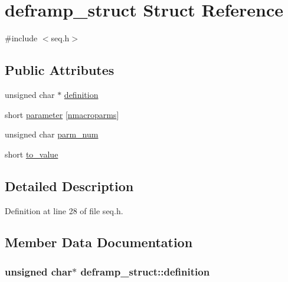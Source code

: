 \hypertarget{structdeframp__struct}{}\section{deframp\+\_\+struct Struct Reference}
\label{structdeframp__struct}


{\ttfamily \#include $<$seq.\+h$>$}

\subsection*{Public Attributes}
\begin{DoxyCompactItemize}
\item 
unsigned char $\ast$ \hyperlink{structdeframp__struct_a5ef5171d81411c72b477b79747b55112}{definition}
\item 
short \hyperlink{structdeframp__struct_a3af41769cb6ffb381b857ba3b53e03c3}{parameter} \mbox{[}\hyperlink{seq_8h_a7418f9520fdd7e58676d5b51a24a6bab}{nmacroparms}\mbox{]}
\item 
unsigned char \hyperlink{structdeframp__struct_ae9d238b85cf184eab9b4da04c615709b}{parm\+\_\+num}
\item 
short \hyperlink{structdeframp__struct_a777fd139d35fcf121fdc4bb5155ccd09}{to\+\_\+value}
\end{DoxyCompactItemize}


\subsection{Detailed Description}


Definition at line 28 of file seq.\+h.



\subsection{Member Data Documentation}
\subsubsection[{\texorpdfstring{definition}{definition}}]{\setlength{\rightskip}{0pt plus 5cm}unsigned char$\ast$ deframp\+\_\+struct\+::definition}\hypertarget{structdeframp__struct_a5ef5171d81411c72b477b79747b55112}{}\label{structdeframp__struct_a5ef5171d81411c72b477b79747b55112}


